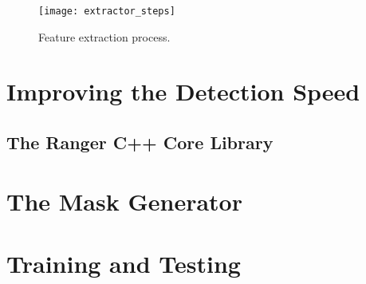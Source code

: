 \begin{figure} [!h]
  \centering
  
  \texttt{[image: extractor\_steps]}
  
  \caption{Feature extraction process. }
  \label{fig:extractor_steps}

\end{figure}

\section{Improving the Detection Speed}
\label{sec:sol_speed}

\subsection{The Ranger C++ Core Library}
\label{sec:sol_rdf}

\section{The Mask Generator}
\label{sec:sol_maskgen}

\section{Training and Testing}
\label{sec:sol_traintest}


